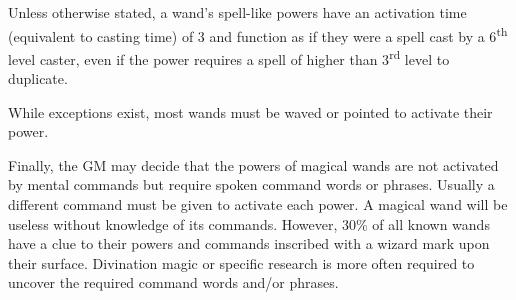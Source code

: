 \begin{multicols}{2}
Unless otherwise stated, a wand's spell-like powers have an activation time (equivalent to casting time) of 3 and function as if they were a spell cast by a 6\textsuperscript{th} level caster, even if the power requires a spell of higher than 3\textsuperscript{rd} level to duplicate.

While exceptions exist, most wands must be waved or pointed to activate their power.

Finally, the GM may decide that the powers of magical wands are not activated by mental commands but require spoken command words or phrases.  Usually a different command must be given to activate each power.  A magical wand will be useless without knowledge of its commands.  However, 30\% of all known wands have a clue to their powers and commands inscribed with a wizard mark upon their surface.  Divination magic or specific research is more often required to uncover the required command words and/or phrases.

\noindent
\begin{minipage}{\columnwidth}


\end{minipage}
\end{multicols}
